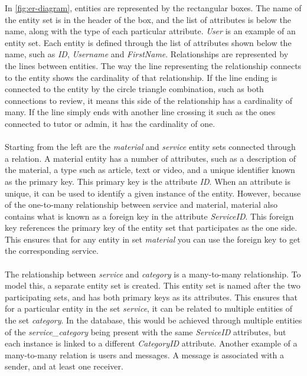 In \autoref{fig:er-diagram}, entities are represented by the rectangular boxes.
The name of the entity set is in the header of the box, and the list of attributes is below the name, along with the type of each particular attribute.
\textit{User} is an example of an entity set.
Each entity is defined through the list of attributes shown below the name, such as \textit{ID}, \textit{Username} and \textit{FirstName}.
Relationships are represented by the lines between entities.
The way the line representing the relationship connects to the entity shows the cardinality of that relationship.
If the line ending is connected to the entity by the circle triangle combination, such as both connections to review, it means this side of the relationship has a cardinality of many.
If the line simply ends with another line crossing it such as the ones connected to tutor or admin, it has the cardinality of one.
\\\\
Starting from the left are the \textit{material} and \textit{service} entity sets connected through a relation. 
A material entity has a number of attributes, such as a description of the material, a type such as article, text or video, and a unique identifier known as the primary key.
This primary key is the attribute \textit{ID}.
When an attribute is unique, it can be used to identify a given instance of the entity. 
However, because of the one-to-many relationship between service and material, material also contains what is known as a foreign key in the attribute \textit{ServiceID}.
This foreign key references the primary key of the entity set that participates as the one side. 
This ensures that for any entity in set \textit{material} you can use the foreign key to get the corresponding service.
\\\\
The relationship between \textit{service} and \textit{category} is a many-to-many relationship.
To model this, a separate entity set is created.
This entity set is named after the two participating sets, and has both primary keys as its attributes.
This ensures that for a particular entity in the set \textit{service}, it can be related to multiple entities of the set \textit{category}.
In the database, this would be achieved through multiple entities of the \textit{service_category} being present with the same \textit{ServiceID} attributes, but each instance is linked to a different \textit{CategoryID} attribute.
Another example of a many-to-many relation is users and messages.
A message is associated with a sender, and at least one receiver.
